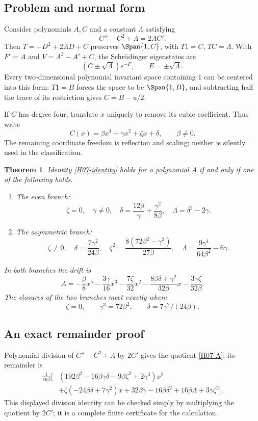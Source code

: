 \documentclass[11pt,a4paper]{article}
\newtheorem{theorem}{Theorem}[section]
\theoremstyle{definition}\newtheorem{definition}[theorem]{Definition}
\theoremstyle{remark}\newtheorem{remark}[theorem]{Remark}
\numberwithin{equation}{section}
\begin{document}
\subsection{Problem and normal form}\label{H07-sec-1}
Consider polynomials $A,C$ and a constant $\Lambda$ satisfying
\begin{equation}\label{H07-identity}C''-C^2+\Lambda=2AC'.\end{equation}
Then $T=-D^2+2AD+C$ preserves $\Span\{1,C\}$, with $T1=C$, $TC=\Lambda$. With $F'=A$ and $V=A^2-A'+C$, the Schr\"odinger eigenstates are
\[(C\pm\sqrt\Lambda)e^{-F},\qquad E=\pm\sqrt\Lambda.
\]
Every two-dimensional polynomial invariant space containing $1$ can be centered into this form: $T1=B$ forces the space to be $\Span\{1,B\}$, and subtracting half the trace of its restriction gives $C=B-u/2$.

If $C$ has degree four, translate $x$ uniquely to remove its cubic coefficient. Thus write
\[C(x)=\beta x^4+\gamma x^2+\zeta x+\delta,\qquad\beta\ne0.
\]
The remaining coordinate freedom is reflection and scaling; neither is silently used in the classification.
\begin{theorem}\label{H07-branches}
Identity \eqref{H07-identity} holds for a polynomial $A$ if and only if one of the following holds.
\begin{enumerate}[label=(\roman*)]
\item The even branch:
\[\zeta=0,\quad\gamma\ne0,\quad
\delta=\frac{12\beta}{\gamma}+\frac{\gamma^2}{8\beta},\quad
\Lambda=\delta^2-2\gamma.
\]
\item The asymmetric branch:
\[\zeta\ne0,\quad
\delta=\frac{7\gamma^2}{24\beta},\quad
\zeta^2=\frac{8(72\beta^2-\gamma^3)}{27\beta},\quad
\Lambda=\frac{9\gamma^4}{64\beta^2}-6\gamma.
\]
\end{enumerate}
In both branches the drift is
\begin{equation}\label{H07-A}
A=-\frac\beta8x^5-\frac{3\gamma}{16}x^3
-\frac{7\zeta}{32}x^2-\frac{8\beta\delta+\gamma^2}{32\beta}x
-\frac{3\gamma\zeta}{32\beta}.
\end{equation}
The closures of the two branches meet exactly where
\[\zeta=0,\qquad\gamma^3=72\beta^2,\qquad
\delta=7\gamma^2/(24\beta).
\]
\end{theorem}
\subsection{An exact remainder proof}\label{H07-sec-2}
Polynomial division of $C''-C^2+\Lambda$ by $2C'$ gives the quotient \eqref{H07-A}; its remainder is
\begin{align}\label{H07-rem}
\frac1{16\beta}\bigl[&
(192\beta^2-16\beta\gamma\delta-9\beta\zeta^2+2\gamma^3)x^2\nonumber\\
&+\zeta(-24\beta\delta+7\gamma^2)x
+32\beta\gamma-16\beta\delta^2+16\beta\Lambda+3\gamma\zeta^2\bigr].
\end{align}
This displayed division identity can be checked simply by multiplying the quotient by $2C'$; it is a complete finite certificate for the calculation.
\end{document}

